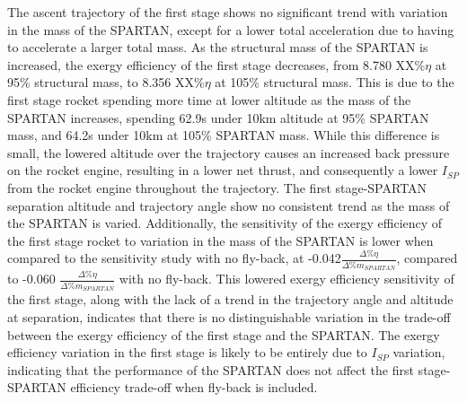 The ascent trajectory of the first stage shows no significant trend with variation in the mass of the SPARTAN, except for a lower total acceleration due to having to accelerate a larger total mass.
As the structural mass of the SPARTAN is increased, the exergy efficiency of the first stage decreases, from 8.780 XX\%$\eta$ at 95\% structural mass, to 8.356 XX\%$\eta$ at 105\% structural mass. This is due to the first stage rocket spending more time at lower altitude as the mass of the SPARTAN increases, spending 62.9s under 10km altitude at 95\% SPARTAN mass, and 64.2s under 10km at 105\% SPARTAN mass. While this difference is small, the lowered altitude over the trajectory causes an increased back pressure on the rocket engine, resulting in a lower net thrust, and consequently a lower $I_{SP}$ from the rocket engine throughout the trajectory. 
 The first stage-SPARTAN separation altitude and trajectory angle show no consistent trend as the mass of the SPARTAN is varied. 
 Additionally, the sensitivity of the exergy efficiency of the first stage rocket to variation in the mass of the SPARTAN is lower when compared to the sensitivity study with no fly-back, at -0.042$\frac{\Delta \%\eta}{\Delta\% m_{SPARTAN}}$, compared to -0.060 $\frac{\Delta \%\eta}{\Delta\% m_{SPARTAN}}$ with no fly-back. This lowered exergy efficiency sensitivity of the first stage, along with the lack of a trend in the trajectory angle and altitude at separation, indicates that there is no distinguishable variation in the trade-off between the exergy efficiency of the first stage and the SPARTAN. The exergy efficiency variation in the first stage is likely to be entirely due to $I_{SP}$ variation, indicating that the performance of the SPARTAN does not affect the first stage-SPARTAN efficiency trade-off when fly-back is included. 
 
